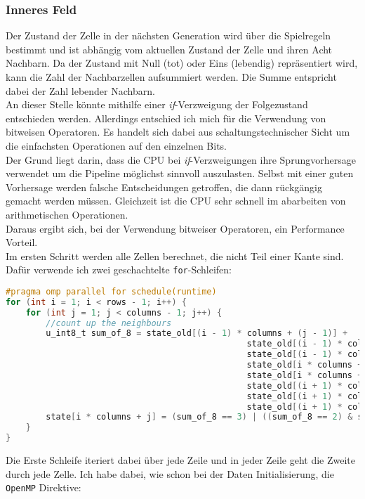 \documentclass[german,plainarticle,hyperref,utf8,appendix]{zihpub}
\begin{document}
   	\subsubsection{Inneres Feld}
   	Der Zustand der Zelle in der nächsten Generation wird über die Spielregeln bestimmt und ist abhängig vom aktuellen Zustand der Zelle und ihren Acht Nachbarn. Da der Zustand mit Null (tot) oder Eins (lebendig) repräsentiert wird, kann die Zahl der Nachbarzellen aufsummiert werden. Die Summe entspricht dabei der Zahl lebender Nachbarn.\\
   	An dieser Stelle könnte mithilfe einer \textit{if}-Verzweigung der Folgezustand entschieden werden. Allerdings entschied ich mich für die Verwendung von bitweisen Operatoren. Es handelt sich dabei aus schaltungstechnischer Sicht um die einfachsten Operationen auf den einzelnen Bits.\\
   	Der Grund liegt darin, dass die CPU bei \textit{if}-Verzweigungen ihre Sprungvorhersage verwendet um die Pipeline möglichst sinnvoll auszulasten. Selbst mit einer guten Vorhersage werden falsche Entscheidungen getroffen, die dann rückgängig gemacht werden müssen. Gleichzeit ist die CPU sehr schnell im abarbeiten von arithmetischen Operationen.\\
   	Daraus ergibt sich, bei der Verwendung bitweiser Operatoren, ein Performance Vorteil.\\
   	
   	Im ersten Schritt werden alle Zellen berechnet, die nicht Teil einer Kante sind. Dafür verwende ich zwei geschachtelte \texttt{for}-Schleifen:\\
   	\begin{lstlisting}[language=C, caption=Berechnung der inneren Zellen]
#pragma omp parallel for schedule(runtime)
for (int i = 1; i < rows - 1; i++) {
   	for (int j = 1; j < columns - 1; j++) {
   		//count up the neighbours
   		u_int8_t sum_of_8 = state_old[(i - 1) * columns + (j - 1)] +
   												state_old[(i - 1) * columns + j] +
   												state_old[(i - 1) * columns + (j + 1)] +
   												state_old[i * columns + (j - 1)] +
   												state_old[i * columns + (j + 1)] +
   												state_old[(i + 1) * columns + (j - 1)] +
   												state_old[(i + 1) * columns + j] +
   												state_old[(i + 1) * columns + (j + 1)];
   		state[i * columns + j] = (sum_of_8 == 3) | ((sum_of_8 == 2) & state_old[i * columns + j]);
   	}
}	\end{lstlisting}

   	Die Erste Schleife iteriert dabei über jede Zeile und in jeder Zeile geht die Zweite durch jede Zelle. Ich habe dabei, wie schon bei der Daten Initialisierung, die \texttt{OpenMP} Direktive:\\
   	
\end{document}
